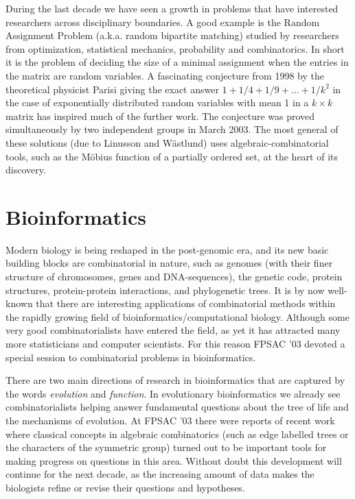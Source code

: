 \documentclass{amsart}
\begin{document}
During the last decade we have seen a growth in problems that have interested
researchers across disciplinary boundaries. A good example is the Random
Assignment Problem (a.k.a. random bipartite matching) studied by
researchers from optimization, statistical mechanics, probability and
combinatorics. In short it is the problem of deciding the size of a minimal
assignment when the entries in the matrix are random variables. A
fascinating conjecture from 1998 by the theoretical physicist Parisi giving
the exact answer $1+1/4+1/9+\dots+1/k^2$ in the case of exponentially
distributed random variables with mean 1 in a $k \times k$ matrix has
inspired much of the further work. The conjecture was proved simultaneously
by two independent groups in March 2003. The most general of these
solutions (due to Linusson and W\"astlund)
uses algebraic-combinatorial tools, such as the M\"obius
function of a partially ordered set, at the heart of its discovery.


\section{Bioinformatics}
Modern biology is being reshaped in the post-genomic era, and its
new basic building blocks are combinatorial in nature, such as
genomes (with their finer structure of chromosomes, genes and
DNA-sequences), the genetic code, protein structures,
protein-protein interactions, and phylogenetic trees. It is by now
well-known that there are interesting applications of
combinatorial methods within the rapidly growing field of
bioinformatics/computational biology. Although some very good
combinatorialists have entered the field, as yet it has attracted
many more statisticians and computer scientists. For this reason
FPSAC '03 devoted a special session to combinatorial problems in
bioinformatics.

There are two main directions of research in bioinformatics that
are captured by the words {\em evolution} and {\em function}. In
evolutionary bioinformatics we already see combinatorialists
helping answer fundamental questions about the tree of life and
the mechanisms of evolution. At FPSAC '03 there were reports of
recent work where classical concepts in algebraic combinatorics
(such as edge labelled trees or the characters of the symmetric
group) turned out to be important tools for making progress on
questions in this area. Without doubt this development will
continue for the next decade, as the increasing amount of data
makes the biologists refine or revise their questions and
hypotheses.
\end{document}
